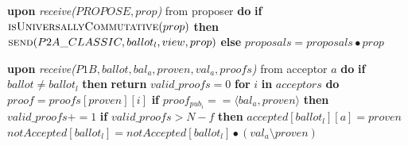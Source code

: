 \begin{algorithm}
\begin{algorithmic}[1]
		\State
		\State \textbf{upon} \textit{receive($PROPOSE, prop$)} from proposer \textbf{do} 
		\State \hspace{\algorithmicindent} \textbf{if} $\Call{isUniversallyCommutative}{prop}$ \textbf{then}
		\State \hspace{\algorithmicindent}\hspace{\algorithmicindent} $\Call{send}{P2A\_CLASSIC, ballot_l,view, prop}$
		\State \hspace{\algorithmicindent} \textbf{else}
		\State \hspace{\algorithmicindent}\hspace{\algorithmicindent} $proposals = proposals \bullet prop$
		
		\State
		\State \textbf{upon} \textit{receive($P1B, ballot, bal_a, proven,val_a, proofs$)} from acceptor $a$ \textbf{do}
		\State \hspace{\algorithmicindent} \textbf{if} $ballot \neq ballot_l$ \textbf{then}
		\State \hspace{\algorithmicindent}\hspace{\algorithmicindent} \textbf{return}
		\State
		\State \hspace{\algorithmicindent} $valid\_proofs = 0$
		\State \hspace{\algorithmicindent} \textbf{for} $i$ \textbf{in} $acceptors$ \textbf{do}
		\State \hspace{\algorithmicindent}\hspace{\algorithmicindent} $proof = proofs[proven][i]$
		\State \hspace{\algorithmicindent}\hspace{\algorithmicindent} \textbf{if} $proof_{pub_i} == \langle bal_a, proven \rangle$ \textbf{then}
		\State \hspace{\algorithmicindent}\hspace{\algorithmicindent}\hspace{\algorithmicindent} 
		$valid\_proofs \mathrel{+{=}} 1$
		\State
		\State \hspace{\algorithmicindent} \textbf{if} $valid\_proofs > N-f$ \textbf{then}
		\State \hspace{\algorithmicindent}\hspace{\algorithmicindent}\hspace{\algorithmicindent} $accepted[ballot_l][a] = proven$
		\State \hspace{\algorithmicindent}\hspace{\algorithmicindent}\hspace{\algorithmicindent} $notAccepted[ballot_l] = notAccepted[ballot_l] \bullet (val_a \setminus proven)$
		

\end{algorithmic}
\end{algorithm}
